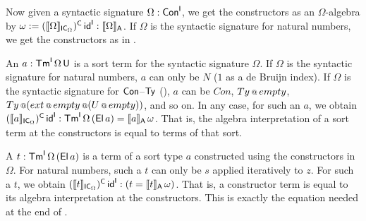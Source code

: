 \documentclass[a4paper,UKenglish,cleveref, autoref]{lipics-v2019}
\begin{document}
\begin{example}\label{ex:constructors}
  Now given a syntactic signature $\Omega:\mathsf{Con}^{\mathsf{I}}$, we get the
  constructors as an $\Omega$-algebra by
  $\omega:=(\llbracket\Omega\rrbracket_{\mathsf{IC}_\Omega})^{\mathsf{C}}\,\mathsf{id}^{\mathsf{I}} :
  \llbracket\Omega\rrbracket_{\mathsf{A}}$. If $\Omega$ is the syntactic signature for natural
  numbers, we get the constructors as in .

  An $a : \mathsf{Tm}^{\mathsf{I}}\,\Omega\,\mathsf{U}$ is a sort term for the syntactic
  signature $\Omega$. If $\Omega$ is the syntactic signature for
  natural numbers, $a$ can only be $N$ ($1$ as a de Bruijn index). If
  $\Omega$ is the syntactic signature for $\mathsf{Con}$--$\mathsf{Ty}$
  (), $a$ can be $Con$, $Ty\mathop{{\scriptstyle @}}{empty}$,
  $Ty\mathop{{\scriptstyle @}}({ext}\mathop{{\scriptstyle @}} {empty}\mathop{{\scriptstyle @}}(U\mathop{{\scriptstyle @}}{empty}))$, and so
  on. In any case, for such an $a$, we obtain
  $(\llbracket a\rrbracket_{\mathsf{IC}_\Omega})^{\mathsf{C}}\,\mathsf{id}^{\mathsf{I}} : \mathsf{Tm}^{\mathsf{I}}\,\Omega\,(\mathsf{El}\,a) = \llbracket
  a\rrbracket_{\mathsf{A}}\,\omega$. That is, the algebra interpretation of a sort term
  at the constructors is equal to terms of that sort.

  A $t : \mathsf{Tm}^{\mathsf{I}}\,\Omega\,(\mathsf{El}\,a)$ is a term of a sort type $a$
  constructed using the constructors in $\Omega$. For natural numbers,
  such a $t$ can only be $s$ applied iteratively to $z$. For such a
  $t$, we obtain
  $(\llbracket t\rrbracket_{\mathsf{IC}_\Omega})^{\mathsf{C}}\,\mathsf{id}^{\mathsf{I}} : (t = \llbracket
  t\rrbracket_{\mathsf{A}}\,\omega)$. That is, a constructor term is equal to its
  algebra interpretation at the constructors. This is exactly the
  equation needed at the end of .
\end{example}
\end{document}
